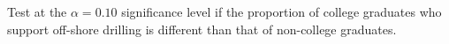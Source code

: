 \documentclass[handout]{beamer}
\newcommand{\blue}[1]{\textcolor{blue2}{#1}}
\newcommand{\phat}{\widehat{p}}
\begin{document}
\begin{frame}[fragile]
\pause Test at the $\alpha = 0.10$ significance level if the proportion of college graduates who support off-shore drilling is different than that of non-college graduates.
%
%
%
%
%
%
%
%

\end{frame}
\end{document}
